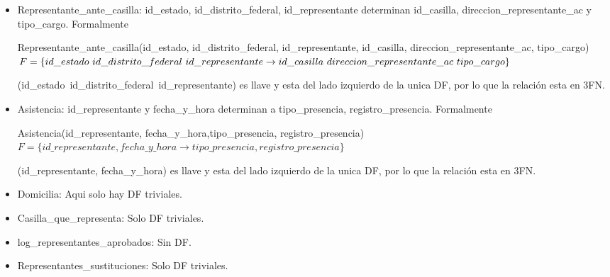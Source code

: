 \documentclass[a4paper,twoside,11pt]{article}
\begin{document}
\begin{itemize}
  \item Representante\_ante\_casilla: id\_estado, id\_distrito\_federal, id\_representante determinan
        id\_casilla, direccion\_representante\_ac y tipo\_cargo. Formalmente

        Representante\_ante\_casilla(id\_estado, id\_distrito\_federal, id\_representante,
        id\_casilla, direccion\_representante\_ac, tipo\_cargo)\\
        $F=\{id\_estado~id\_distrito\_federal~id\_representante\rightarrow\\
        id\_casilla~direccion\_representante\_ac~tipo\_cargo\}$

        (id\_estado~id\_distrito\_federal~id\_representante) es llave y esta del lado izquierdo de la unica DF,
        por lo que la relación esta en 3FN.

  \item Asistencia: id\_representante y fecha\_y\_hora determinan a tipo\_presencia, registro\_presencia. Formalmente

        Asistencia(id\_representante, fecha\_y\_hora,tipo\_presencia, registro\_presencia)\\
        $F=\{id\_representante, fecha\_y\_hora \rightarrow tipo\_presencia, registro\_presencia\}$

        (id\_representante, fecha\_y\_hora) es llave y esta del lado izquierdo de la unica DF,
        por lo que la relación esta en 3FN.
        
  \item Domicilia: Aqui solo hay DF triviales.
  \item Casilla\_que\_representa: Solo DF triviales.
  \item log\_representantes\_aprobados: Sin DF.
  \item Representantes\_sustituciones: Solo DF triviales.

\end{itemize}
\end{document}
